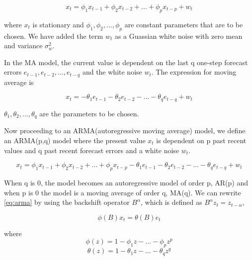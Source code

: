         \begin{equation} \label{eq:autoregressive}
          x_{t} = \phi_{1}x_{t-1} + \phi_{2}x_{t-2} + ... + \phi_{p}x_{t-p} + w_{t}
        \end{equation}

where $x_{t}$ is stationary and $\phi_{1}, \phi_{2},..., \phi_{p}$ are constant
parameters that are to be chosen. We have added the term $w_{t}$ as a Guassian white noise with
zero mean and variance $\sigma^{2}_{w}$.

In the MA model, the current value is dependent on the last q one-step forecast errors
$e_{t-1}, e_{t-2},...,e_{t-q}$ and the white noise $w_{t}$. The expression for moving average
is

        \begin{equation} \label{eq:movingaverage}
          x_{t} = -\theta_{1}e_{t-1} - \theta_{2}e_{t-2} - ... - \theta_{q}e_{t-q} + w_{t}
        \end{equation}

$\theta_{1}, \theta_{2},..., \theta_{q}$ are the parameters to be chosen.

Now proceeding to an ARMA(autoregressive moving average) model, we define an ARMA(p,q) model
where the present value $x_{t}$ is dependent on p past recent values and q past recent forecast
errors and a white noise $w_{t}$.

        \begin{equation} \label{eq:arma}
          x_{t} = \phi_{1}x_{t-1} + \phi_{2}x_{t-2} + ... + \phi_{p}x_{t-p} - \theta_{1}e_{t-1}
          - \theta_{2}e_{t-2} - ... - \theta_{q}e_{t-q} + w_{t}
        \end{equation}

When q is 0, the model becomes an autoregressive model of order p, AR(p) and when p is 0 the model
is a moving average of order q, MA(q). We can rewrite \ref{eq:arma} by using the backshift
operator $B^{\alpha}$, which is defined as $B^{\alpha}z_{t} = z_{t-\alpha}$,

        \begin{equation} \label{eq:armarewrite}
          \phi(B)x_{t} = \theta(B)e_{t}
        \end{equation}

where
        \begin{equation}
            \phi(z) = 1 - \phi_{1}z - ... - \phi_{p}z^{p}
        \end{equation}
        \begin{equation}
            \theta(z) = 1 - \theta_{1}z - ... - \theta_{q}z^{q}
        \end{equation}

